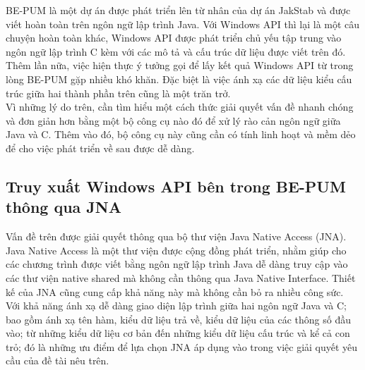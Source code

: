 BE-PUM là một dự án được phát triển lên từ nhân của dự án JakStab và được viết hoàn toàn trên ngôn ngữ lập trình Java. Với Windows API thì lại là một câu chuyện hoàn toàn khác, Windows API được phát triển chủ yếu tập trung vào ngôn ngữ lập trình C kèm với các mô tả và cấu trúc dữ liệu được viết trên đó. Thêm lần nữa, việc hiện thực ý tưởng gọi để lấy kết quả Windows API từ trong lòng BE-PUM gặp nhiều khó khăn. Đặc biệt là việc ánh xạ các dữ liệu kiểu cấu trúc giữa hai thành phần trên cũng là một trăn trở.\\

Vì những lý do trên, cần tìm hiểu một cách thức giải quyết vấn đề nhanh chóng và đơn giản hơn bằng một bộ công cụ nào đó để xử lý rào cản ngôn ngữ giữa Java và C. Thêm vào đó, bộ công cụ này cũng cần có tính linh hoạt và mềm dẻo để cho việc phát triển về sau được dễ dàng.\\




	\subsection{Truy xuất Windows API bên trong BE-PUM thông qua JNA}

Vấn đề trên được giải quyết thông qua bộ thư viện Java Native Access (JNA).\\

Java Native Access là một thư viện được cộng đồng phát triển, nhằm giúp cho các chương trình được viết bằng ngôn ngữ lập trình Java dễ dàng truy cập vào các thư viện native shared mà không cần thông qua Java Native Interface. Thiết kế của JNA cũng cung cấp khả năng này mà không cần bỏ ra nhiều công sức.\\

Với khả năng ánh xạ dễ dàng giao diện lập trình giữa hai ngôn ngữ Java và C; bao gồm ánh xạ tên hàm, kiểu dữ liệu trả về, kiểu dữ liệu của các thông số đầu vào; từ những kiểu dữ liệu cơ bản đến những kiểu dữ liệu cấu trúc và kể cả con trỏ; đó là những ưu điểm để lựa chọn JNA áp dụng vào trong việc giải quyết yêu cầu của đề tài nêu trên.